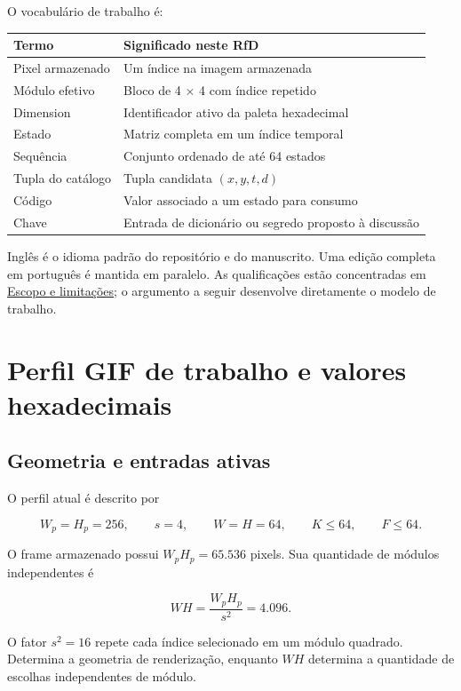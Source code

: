 \documentclass[
  11pt,
  a4paper,
]{article}
\begin{document}
O vocabulário de trabalho é:

\begin{longtable}[]{@{}ll@{}}
\toprule\noalign{}
Termo & Significado neste RfD \\
\midrule\noalign{}
\endhead
\bottomrule\noalign{}
\endlastfoot
Pixel armazenado & Um índice na imagem armazenada \\
Módulo efetivo & Bloco de 4 × 4 com índice repetido \\
Dimension & Identificador ativo da paleta hexadecimal \\
Estado & Matriz completa em um índice temporal \\
Sequência & Conjunto ordenado de até 64 estados \\
Tupla do catálogo & Tupla candidata \((x,y,t,d)\) \\
Código & Valor associado a um estado para consumo \\
Chave & Entrada de dicionário ou segredo proposto à discussão \\
\end{longtable}

Inglês é o idioma padrão do repositório e do manuscrito. Uma edição
completa em português é mantida em paralelo. As qualificações estão
concentradas em \protect\hyperlink{escopo-e-limitauxe7uxf5es}{Escopo e
limitações}; o argumento a seguir desenvolve diretamente o modelo de
trabalho.

\hypertarget{perfil-gif-de-trabalho-e-valores-hexadecimais}{%
\section{Perfil GIF de trabalho e valores
hexadecimais}\label{perfil-gif-de-trabalho-e-valores-hexadecimais}}

\hypertarget{geometria-e-entradas-ativas}{%
\subsection{Geometria e entradas
ativas}\label{geometria-e-entradas-ativas}}

O perfil atual é descrito por

\[
W_p=H_p=256,\qquad s=4,\qquad W=H=64,\qquad K\le64,\qquad F\le64.
\]

O frame armazenado possui \(W_pH_p=65.536\) pixels. Sua quantidade de
módulos independentes é

\[
WH=\frac{W_pH_p}{s^2}=4.096.
\]

O fator \(s^2=16\) repete cada índice selecionado em um módulo quadrado.
Determina a geometria de renderização, enquanto \(WH\) determina a
quantidade de escolhas independentes de módulo.
\end{document}
